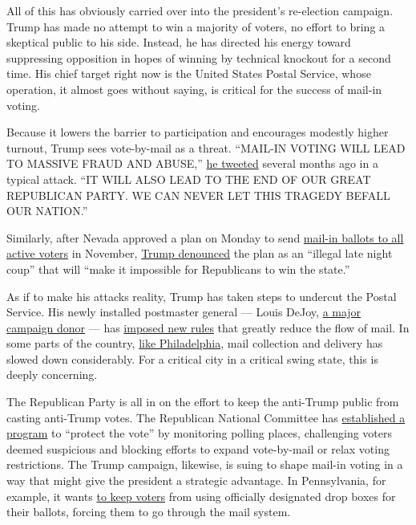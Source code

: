 All of this has obviously carried over into the president's re-election
campaign. Trump has made no attempt to win a majority of voters, no
effort to bring a skeptical public to his side. Instead, he has directed
his energy toward suppressing opposition in hopes of winning by
technical knockout for a second time. His chief target right now is the
United States Postal Service, whose operation, it almost goes without
saying, is critical for the success of mail-in voting.

Because it lowers the barrier to participation and encourages modestly
higher turnout, Trump sees vote-by-mail as a threat. ``MAIL-IN VOTING
WILL LEAD TO MASSIVE FRAUD AND ABUSE,''
\href{https://twitter.com/realdonaldtrump/status/1266172570983940101?s=21}{he
tweeted} several months ago in a typical attack. ``IT WILL ALSO LEAD TO
THE END OF OUR GREAT REPUBLICAN PARTY. WE CAN NEVER LET THIS TRAGEDY
BEFALL OUR NATION.''

Similarly, after Nevada approved a plan on Monday to send
\href{https://www.cnn.com/2020/08/03/politics/nevada-mail-ballots-registered-voters/index.html}{mail-in
ballots to all active voters} in November,
\href{https://twitter.com/realdonaldtrump/status/1290250416278532096?s=21}{Trump
denounced} the plan as an ``illegal late night coup'' that will ``make
it impossible for Republicans to win the state.''

As if to make his attacks reality, Trump has taken steps to undercut the
Postal Service. His newly installed postmaster general --- Louis DeJoy,
\href{https://www.nytimes.com/2020/07/31/us/politics/trump-usps-mail-delays.html}{a
major campaign donor} --- has
\href{https://www.washingtonpost.com/business/2020/07/14/postal-service-trump-dejoy-delay-mail/}{imposed
new rules} that greatly reduce the flow of mail. In some parts of the
country, \href{https://t.co/MPqSHlXP1P}{like Philadelphia}, mail
collection and delivery has slowed down considerably. For a critical
city in a critical swing state, this is deeply concerning.

The Republican Party is all in on the effort to keep the anti-Trump
public from casting anti-Trump votes. The Republican National Committee
has
\href{https://www.nytimes.com/2020/05/18/us/Voting-republicans-trump.html}{established
a program} to ``protect the vote'' by monitoring polling places,
challenging voters deemed suspicious and blocking efforts to expand
vote-by-mail or relax voting restrictions. The Trump campaign, likewise,
is suing to shape mail-in voting in a way that might give the president
a strategic advantage. In Pennsylvania, for example, it wants
\href{https://www.inquirer.com/politics/election/trump-campaign-lawsuit-pennsylvania-mail-ballots-20200629.html}{to
keep voters} from using officially designated drop boxes for their
ballots, forcing them to go through the mail system.

